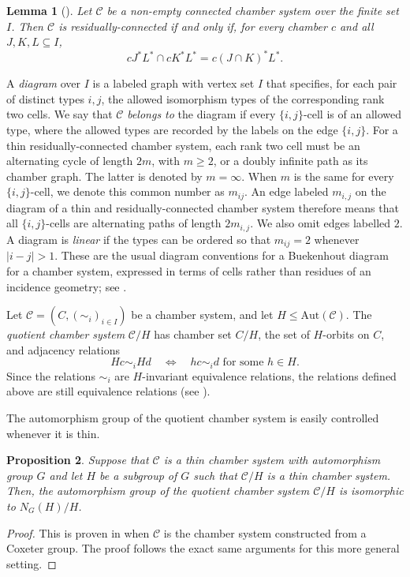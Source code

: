\documentclass[11pt,letterpaper]{amsart}
\newtheorem{prop}{Proposition}[section]
\newtheorem{lemma}[prop]{Lemma}
\newcommand{\CC}{\mathcal{C}}
\newcommand{\Aut}{\mathrm{Aut}}
\newcommand{\C}{\mathcal{C}}
\begin{document}
\begin{lemma}[{\cite[Lemma~3.4.9]{buekenhout2013diagram}}]
\label{lem:rc-characterisation}
Let $\CC$ be a non-empty connected chamber system over the finite set $I$.
Then $\CC$ is residually-connected if and only if, for every chamber $c$ and
all $J,K,L\subseteq I$,
\begin{equation}
\label{eq:rc-cell-identity}
    cJ^*L^*\cap cK^*L^*=c(J\cap K)^*L^*.
\end{equation}
\end{lemma}

A \emph{diagram} over $I$ is a labeled graph with vertex set $I$ that specifies, for each pair of distinct types
$i,j$, the allowed isomorphism types of the corresponding rank two cells.  We say that $\CC$
\emph{belongs to} the diagram if every $\{i,j\}$-cell is of an allowed
type, where the allowed types are recorded by the labels on the edge $\{i,j\}$. For a thin residually-connected chamber system, each rank two cell
must be an alternating cycle of length $2m$, with $m\geq2$, or a doubly infinite
path as its chamber graph.  The latter is denoted by $m=\infty$.  When $m$
is the same for every $\{i,j\}$-cell, we denote this common number as $m_{ij}$. An edge labeled $m_{i,j}$ on the diagram of a thin and residually-connected chamber system therefore means that all $\{i,j\}$-cells are alternating paths of length $2m_{i,j}$. We also omit edges labelled $2$.  A diagram is \emph{linear} if the types can be ordered so that
$m_{ij}=2$ whenever $|i-j|>1$.  These are the usual diagram conventions for a Buekenhout diagram for a chamber system,
expressed in terms of cells rather than residues of an incidence geometry;
see \cite[Sections~3.5 and~4.1]{buekenhout2013diagram}.

Let $\CC=(C,(\sim_i)_{i\in I})$ be a chamber system, and let
$H\leq\Aut(\CC)$.  The \emph{quotient chamber system} $\CC/H$ has chamber set
$C/H$, the set of $H$-orbits on $C$, and adjacency relations
\begin{equation*}
    Hc\sim_i Hd
    \quad\Longleftrightarrow\quad
    hc\sim_i d\text{ for some }h\in H.
\end{equation*}
Since the relations $\sim_i$ are $H$-invariant equivalence relations, the
relations defined above are still
equivalence relations (see \cite[Proposition~3.1.10]{buekenhout2013diagram}).

The automorphism group of the quotient chamber system is easily controlled whenever it is thin.

\begin{prop}\label{prop:AutomorphismGroupQuotient}
    Suppose that $\C$ is a thin chamber system with automorphism group $G$ and let $H$ be a subgroup of $G$ such that $\C/H$ is a thin chamber system. Then, the automorphism group of the quotient chamber system $\C/H$ is isomorphic to $N_G(H)/H$.
\end{prop}
\begin{proof}
    This is proven in \cite[Proposition 4.2.10]{buekenhout2013diagram} when $\C$ is the chamber system constructed from a Coxeter group. The proof follows the exact same arguments for this more general setting.
\end{proof}
\end{document}
